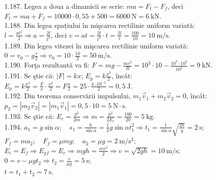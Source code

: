 1.187. Legea a doua a dinamicii se scrie: $m a=F_{t}-F_{f}$, deci $F_{t}=m a+F_{f}=10000 \cdot 0,55+500=6000 \mathrm{~N}=6 \mathrm{~kN}$.\\

1.188. Din legea spațiului în mişcarea rectilinie uniform variată:\\ $l=\frac{a t^{2}}{2} \Rightarrow a=\frac{2 l}{t^{2}}$, deci $v=a t=\frac{2 l}{t^{2}} \cdot t=\frac{2 l}{t}=\frac{100}{10}=10 \mathrm{~m} / \mathrm{s}$.\\

1.189. Din legea vitezei în mişcarea rectilinie uniform variată:\\ $0=v_{0}-g \frac{\tau}{2} \Rightarrow v_{0}=10 \cdot \frac{10}{2}=50 \mathrm{~m} / \mathrm{s}$.\\

1.190. Forţa rezultantă va fi: $F=m g-\frac{m v^{2}}{R}=10^{3} \cdot 10-\frac{10^{3} \cdot 10^{2}}{10^{2}}=9 \mathrm{~kN}$.\\

1.191. Se ştie că: $|F|=k x$; $E_{p}=k \frac{x^{2}}{2}$, încât:\\ $E_{p}=k \frac{x^{2}}{2}=\frac{F}{x} \cdot \frac{x^{2}}{2}=F \frac{x}{2}=25 \cdot \frac{4 \cdot 10^{-2}}{2}=0,5 \mathrm{~J}$.\\

1.192. Din teorema conservării impulsului, $m_{1} \vec{v}_{1}+m_{2} \vec{v}_{2}=0$, încât:\\ $p_{2}=\left|m_{2} \vec{v}_{2}\right|=\left|m_{1} \vec{v}_{1}\right|=0,5 \cdot 10=5 \mathrm{~N} \cdot \mathrm{s}$.\\

1.193. Se ştie că: $E_{c}=\frac{p^{2}}{2 m} \Rightarrow m=\frac{p^{2}}{2 E_{c}}=\frac{100}{20}=5 \mathrm{~kg}$.\\

1.194. $a_{1}=g \sin \alpha; \quad s_{1}=\frac{h}{\sin \alpha}=\frac{1}{2} g \sin \alpha t_{1}^{2} \Rightarrow t_{1}=\frac{1}{\sin \alpha} \sqrt{\frac{2 h}{g}}=2 \mathrm{~s}$;\\ $F_{f}=m a_{2}; \quad F_{f}=\mu m g; \quad a_{2}=\mu g=2 \mathrm{~m} / \mathrm{s}^{2}$;\\ $E_{i}=E_{f} \Rightarrow E_{p f}=E_{c} \Rightarrow m g h=\frac{m v^{2}}{2} \Rightarrow v=\sqrt{2 g h}=10 \mathrm{~m} / \mathrm{s}$;\\ $0=v-\mu g t_{2} \Rightarrow t_{2}=\frac{v}{\mu g}=5 \mathrm{~s}$;\\ $t=t_{1}+t_{2}=7 \mathrm{~s}$.\\

